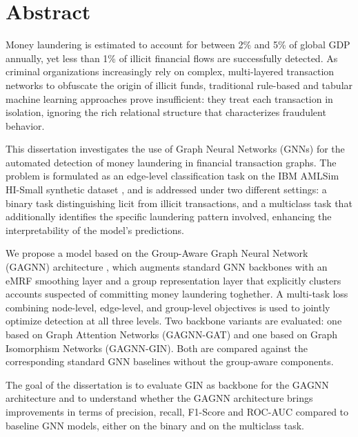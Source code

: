 \chapter*{Abstract}

Money laundering is estimated to account for between 2\% and 5\% of global GDP annually, yet less than 1\% of illicit financial flows are successfully detected. As criminal organizations increasingly rely on complex, multi-layered transaction networks to obfuscate the origin of illicit funds, traditional rule-based and tabular machine learning approaches prove insufficient: they treat each transaction in isolation, ignoring the rich relational structure that characterizes fraudulent behavior.

This dissertation investigates the use of Graph Neural Networks (GNNs) for the automated detection of money laundering in financial transaction graphs. The problem is formulated as an edge-level classification task on the IBM AMLSim HI-Small synthetic dataset \cite{AMLWorld}, and is addressed under two different settings: a binary task distinguishing licit from illicit transactions, and a multiclass task that additionally identifies the specific laundering pattern involved, enhancing the interpretability of the model's predictions.

We propose a model based on the Group-Aware Graph Neural Network (GAGNN) architecture \cite{mainpaper}, which augments standard GNN backbones with an eMRF smoothing layer and a group representation layer that explicitly clusters accounts suspected of committing money laundering toghether. A multi-task loss combining node-level, edge-level, and group-level objectives is used to jointly optimize detection at all three levels. Two backbone variants are evaluated: one based on Graph Attention Networks (GAGNN-GAT) and one based on Graph Isomorphism Networks (GAGNN-GIN). Both are compared against the corresponding standard GNN baselines without the group-aware components.

The goal of the dissertation is to evaluate GIN as backbone for the GAGNN architecture and to understand whether the GAGNN architecture brings improvements in terms of precision, recall, F1-Score and ROC-AUC compared to baseline GNN models, either on the binary and on the multiclass task.

